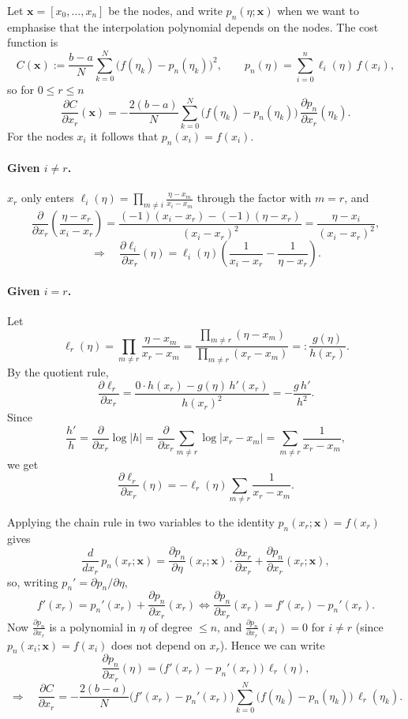 \documentclass[11pt]{article}
\begin{document}
Let $\mathbf{x} = [x_0,\dots,x_n]$ be the nodes, and write $p_n(\eta;\mathbf{x})$ when we want to emphasise that the interpolation polynomial depends on the nodes. The cost function is
\[
C(\mathbf{x}) := \frac{b-a}{N}\sum_{k=0}^{N}\big(f(\eta_k)-p_n(\eta_k)\big)^2, \qquad p_n(\eta) = \sum_{i=0}^{n}\ell_i(\eta)\,f(x_i),
\]
so for $0 \le r \le n$
\[
\frac{\partial C}{\partial x_r}(\mathbf{x}) = -\frac{2(b-a)}{N}\sum_{k=0}^{N}\big(f(\eta_k)-p_n(\eta_k)\big)\,\frac{\partial p_n}{\partial x_r}(\eta_k).
\]
For the nodes $x_i$ it follows that $p_n(x_i) = f(x_i)$.


\paragraph{Given $i \neq r$.} $x_r$ only enters $\ell_i(\eta) = \prod_{m\neq i}\frac{\eta-x_m}{x_i-x_m}$ through the factor with $m = r$, and
\[
\frac{\partial}{\partial x_r}\left(\frac{\eta-x_r}{x_i-x_r}\right) = \frac{(-1)(x_i-x_r)-(-1)(\eta-x_r)}{(x_i-x_r)^2} = \frac{\eta-x_i}{(x_i-x_r)^2},
\]
\[
\Longrightarrow\quad \frac{\partial \ell_i}{\partial x_r}(\eta) = \ell_i(\eta)\left(\frac{1}{x_i-x_r}-\frac{1}{\eta-x_r}\right).
\]

\paragraph{Given $i = r$.} Let
\[
\ell_r(\eta) = \prod_{m\neq r}\frac{\eta-x_m}{x_r-x_m} = \frac{\prod_{m\neq r}(\eta-x_m)}{\prod_{m\neq r}(x_r-x_m)} =: \frac{g(\eta)}{h(x_r)}.
\]
By the quotient rule,
\[
\frac{\partial \ell_r}{\partial x_r} = \frac{0\cdot h(x_r)-g(\eta)\,h'(x_r)}{h(x_r)^2} = -\frac{g\,h'}{h^2}.
\]
Since
\[
\frac{h'}{h} = \frac{\partial}{\partial x_r}\log|h| = \frac{\partial}{\partial x_r}\sum_{m\neq r}\log|x_r-x_m| = \sum_{m\neq r}\frac{1}{x_r-x_m},
\]
we get
\[
\frac{\partial \ell_r}{\partial x_r}(\eta) = -\ell_r(\eta)\sum_{m\neq r}\frac{1}{x_r-x_m}.
\]


Applying the chain rule in two variables to the identity $p_n(x_r;\mathbf{x}) = f(x_r)$ gives
\[
\frac{d}{dx_r}\,p_n(x_r;\mathbf{x}) = \frac{\partial p_n}{\partial \eta}(x_r;\mathbf{x})\cdot\frac{\partial x_r}{\partial x_r} + \frac{\partial p_n}{\partial x_r}(x_r;\mathbf{x}),
\]
so, writing $p_n' = \partial p_n/\partial\eta$,
\[
f'(x_r) = p_n'(x_r) + \frac{\partial p_n}{\partial x_r}(x_r) \iff \frac{\partial p_n}{\partial x_r}(x_r) = f'(x_r)-p_n'(x_r).
\]
Now $\frac{\partial p_n}{\partial x_r}$ is a polynomial in $\eta$ of degree $\le n$, and $\frac{\partial p_n}{\partial x_r}(x_i) = 0$ for $i \neq r$ (since $p_n(x_i;\mathbf{x}) = f(x_i)$ does not depend on $x_r$). Hence we can write
\[
\frac{\partial p_n}{\partial x_r}(\eta) = \big(f'(x_r)-p_n'(x_r)\big)\,\ell_r(\eta),
\]
\[
\Longrightarrow\quad \frac{\partial C}{\partial x_r} = -\frac{2(b-a)}{N}\big(f'(x_r)-p_n'(x_r)\big)\sum_{k=0}^{N}\big(f(\eta_k)-p_n(\eta_k)\big)\,\ell_r(\eta_k).
\]
\end{document}
